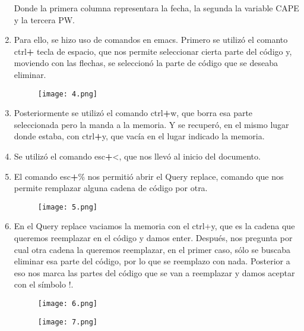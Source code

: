 \documentclass[a4paper]{article}
\begin{document}
\begin{enumerate}
Donde la primera columna representara la fecha, la segunda la variable CAPE y la tercera PW. 
\item Para ello, se hizo uso de comandos en emacs. Primero se utilizó el comanto ctrl\textbf{+ }tecla de espacio, que nos permite seleccionar cierta parte del código y, moviendo con las flechas, se seleccionó la parte de código que se deseaba eliminar.
\begin{figure}[h!]
  \texttt{[image: 4.png]}
  \centering
  \label{fig:4}
\end{figure}
\item Posteriormente se utilizó el comando ctrl\textbf{+}w, que borra esa parte seleccionada pero la manda a la memoria. Y se recuperó, en el mismo lugar donde estaba, con ctrl\textbf{+}y, que vacía en el lugar indicado la memoria.
\item Se utilizó el comando esc\textbf{+}<, que nos llevó al inicio del documento. 
\item El comando esc\textbf{+}\% nos permitió abrir el Query replace, comando que nos permite remplazar alguna cadena de código por otra. 
\begin{figure}[h!]
  \texttt{[image: 5.png]}
  \centering
  \label{fig:5}
\end{figure}
\item En el Query replace vaciamos la memoria con el ctrl+y, que es la cadena que queremos reemplazar en el código y damos enter. Después, nos pregunta por cual otra cadena la queremos reemplazar, en el primer caso, sólo se buscaba eliminar esa parte del código, por lo que se reemplazo con nada. Posterior a eso nos marca las partes del código que se van a reemplazar y damos aceptar con el símbolo !. 
\begin{figure}[h!]
  \texttt{[image: 6.png]}
  \centering
  \label{fig:6}
\end{figure}
\begin{figure}[h!]
  \texttt{[image: 7.png]}
  \centering
  \label{fig:7}
\end{figure}


\end{enumerate}
\end{document}
